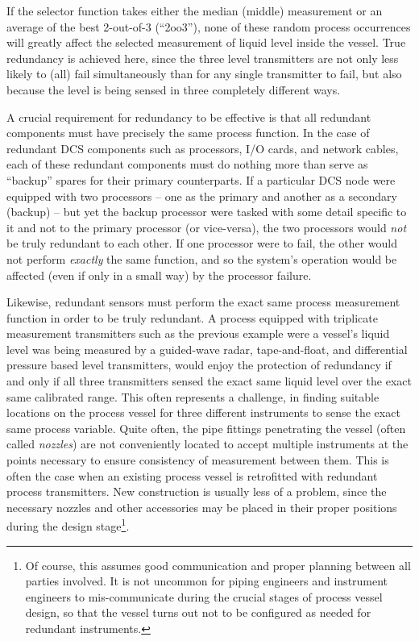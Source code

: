 If the selector function takes either the median (middle) measurement or an average of the best 2-out-of-3 (``2oo3''), none of these random process occurrences will greatly affect the selected measurement of liquid level inside the vessel.  True redundancy is achieved here, since the three level transmitters are not only less likely to (all) fail simultaneously than for any single transmitter to fail, but also because the level is being sensed in three completely different ways.

\vskip 10pt

A crucial requirement for redundancy to be effective is that all redundant components must have precisely the same process function.  In the case of redundant DCS components such as processors, I/O cards, and network cables, each of these redundant components must do nothing more than serve as ``backup'' spares for their primary counterparts.  If a particular DCS node were equipped with two processors -- one as the primary and another as a secondary (backup) -- but yet the backup processor were tasked with some detail specific to it and not to the primary processor (or vice-versa), the two processors would \textit{not} be truly redundant to each other.  If one processor were to fail, the other would not perform \textit{exactly} the same function, and so the system's operation would be affected (even if only in a small way) by the processor failure.

Likewise, redundant sensors must perform the exact same process measurement function in order to be truly redundant.  A process equipped with triplicate measurement transmitters such as the previous example were a vessel's liquid level was being measured by a guided-wave radar, tape-and-float, and differential pressure based level transmitters, would enjoy the protection of redundancy if and only if all three transmitters sensed the exact same liquid level over the exact same calibrated range.  This often represents a challenge, in finding suitable locations on the process vessel for three different instruments to sense the exact same process variable.  Quite often, the pipe fittings penetrating the vessel (often called \textit{nozzles}) are not conveniently located to accept multiple instruments at the points necessary to ensure consistency of measurement between them.  This is often the case when an existing process vessel is retrofitted with redundant process transmitters.  New construction is usually less of a problem, since the necessary nozzles and other accessories may be placed in their proper positions during the design stage\footnote{Of course, this assumes good communication and proper planning between all parties involved.  It is not uncommon for piping engineers and instrument engineers to mis-communicate during the crucial stages of process vessel design, so that the vessel turns out not to be configured as needed for redundant instruments.}.  

